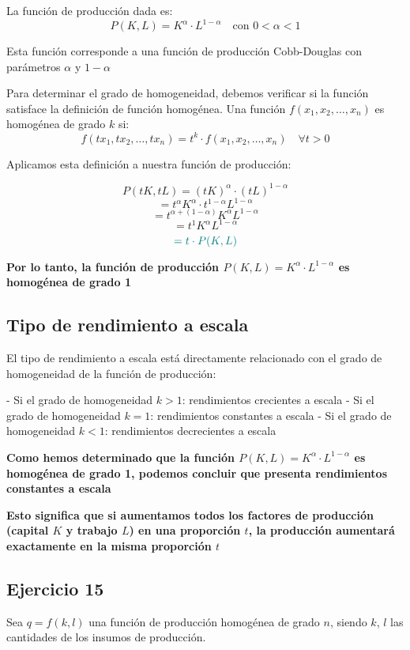 \documentclass{article}
\begin{document}
La función de producción dada es:
\[
P(K, L) = K^{\alpha} \cdot L^{1 - \alpha} \quad \text{con } 0 < \alpha < 1
\]

Esta función corresponde a una función de producción Cobb-Douglas con parámetros \(\alpha\) y \(1-\alpha\)

Para determinar el grado de homogeneidad, debemos verificar si la función satisface la definición de función homogénea. Una función \(f(x_1, x_2, \ldots, x_n)\) es homogénea de grado \(k\) si:
\[
f(tx_1, tx_2, \ldots, tx_n) = t^k \cdot f(x_1, x_2, \ldots, x_n) \quad \forall t > 0
\]

Aplicamos esta definición a nuestra función de producción:

\[
P(tK, tL) = (tK)^{\alpha} \cdot (tL)^{1 - \alpha}
\]
\[
= t^{\alpha} K^{\alpha} \cdot t^{1-\alpha} L^{1-\alpha}
\]
\[
= t^{\alpha + (1-\alpha)} K^{\alpha} L^{1-\alpha}
\]
\[
= t^{1} K^{\alpha} L^{1-\alpha}
\]
\[
\color{teal}
= t \cdot P(K, L)
\]

\textbf{\color{teal}Por lo tanto, la función de producción \(P(K, L) = K^{\alpha} \cdot L^{1-\alpha}\) es homogénea de grado 1}

\subsection*{Tipo de rendimiento a escala}

El tipo de rendimiento a escala está directamente relacionado con el grado de homogeneidad de la función de producción:

- Si el grado de homogeneidad \(k > 1\): rendimientos crecientes a escala
- Si el grado de homogeneidad \(k = 1\): rendimientos constantes a escala
- Si el grado de homogeneidad \(k < 1\): rendimientos decrecientes a escala

\textbf{\color{teal}Como hemos determinado que la función \(P(K, L) = K^{\alpha} \cdot L^{1-\alpha}\) es homogénea de grado 1, podemos concluir que presenta rendimientos constantes a escala}

\textbf{\color{teal}Esto significa que si aumentamos todos los factores de producción (capital \(K\) y trabajo \(L\)) en una proporción \(t\), la producción aumentará exactamente en la misma proporción \(t\)}

\newpage
\subsection{Ejercicio 15}

Sea \(q = f(k, l)\) una función de producción homogénea de grado \(n\),  
siendo \(k\), \(l\) las cantidades de los insumos de producción.  
\end{document}
